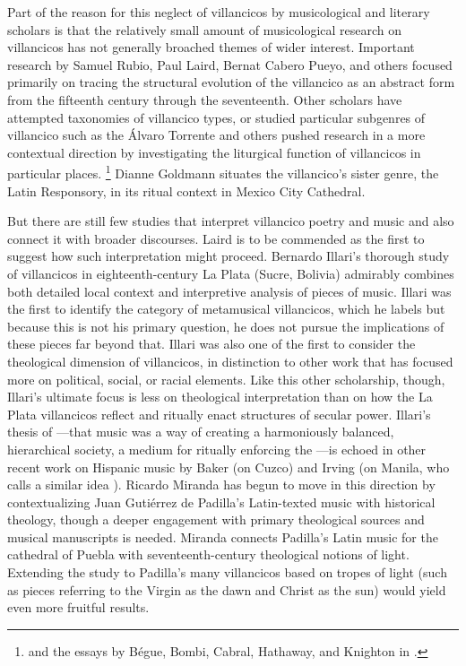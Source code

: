 Part of the reason for this neglect of villancicos by musicological and literary scholars is that the relatively small amount of musicological research on villancicos has not generally broached themes of wider interest.
Important research by Samuel Rubio, Paul Laird, Bernat Cabero Pueyo, and others focused primarily on tracing the structural evolution of the villancico as an abstract form from the fifteenth century through the seventeenth.%
	\autocites{Rubio:Forma}{Laird:VC}{CaberoPueyo:PhD}
Other scholars have attempted taxonomies of villancico types, or studied particular subgenres of villancico such as the 
Álvaro Torrente and others pushed research in a more contextual direction by investigating the liturgical function of villancicos in particular places.%
	\footnote{%
	\autocite{Torrente:PhD} and the essays by Bégue, Bombi, Cabral, Hathaway, and Knighton in \autocite{Knighton-Torrente:VCs}.
	}
Dianne Goldmann situates the villancico's sister genre, the Latin Responsory, in its ritual context in Mexico City Cathedral.
	\autocite{Goldman:Responsory}

But there are still few studies that interpret villancico poetry and music and also connect it with broader discourses.
Laird is to be commended as the first to suggest how such interpretation might proceed.
Bernardo Illari's thorough study of villancicos in eighteenth-century La Plata (Sucre, Bolivia) admirably combines both detailed local context and interpretive analysis of pieces of music.%
	\autocites{Illari:Polychoral}{Illari:Popular}
Illari was the first to identify the category of metamusical villancicos, which he labels  but because this is not his primary question, he does not pursue the implications of these pieces far beyond that.
Illari was also one of the first to consider the theological dimension of villancicos, in distinction to other work that has focused more on political, social, or racial elements.
Like this other scholarship, though, Illari's ultimate focus is less on theological interpretation than on how the La Plata villancicos reflect and ritually enact structures of secular power.
Illari's thesis of ---that music was a way of creating a harmoniously balanced, hierarchical society, a medium for ritually enforcing the ---is echoed in other recent work on Hispanic music by Baker (on Cuzco) and Irving (on Manila, who calls a similar idea ).%
	\autocites{Baker:Harmony}{Irving:Colonial}
Ricardo Miranda has begun to move in this direction by contextualizing Juan Gutiérrez de Padilla's Latin-texted music with historical theology, though a deeper engagement with primary theological sources and musical manuscripts is needed.%
	\autocite{Miranda:PadillaLuz}
Miranda connects Padilla's Latin music for the cathedral of Puebla with seventeenth-century theological notions of light. 
Extending the study to Padilla's many villancicos based on tropes of light (such as pieces referring to the Virgin as the dawn and Christ as the sun) would yield even more fruitful results.

